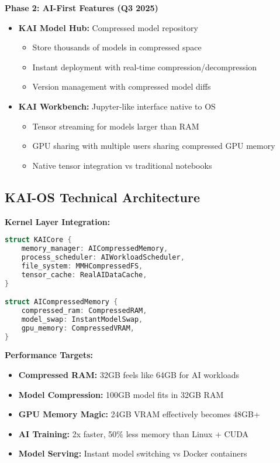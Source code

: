 \documentclass[12pt,a4paper]{article}
\begin{document}
\textbf{Phase 2: AI-First Features (Q3 2025)}
\begin{itemize}
    \item \textbf{KAI Model Hub:} Compressed model repository
    \begin{itemize}
        \item Store thousands of models in compressed space
        \item Instant deployment with real-time compression/decompression
        \item Version management with compressed model diffs
    \end{itemize}
    \item \textbf{KAI Workbench:} Jupyter-like interface native to OS
    \begin{itemize}
        \item Tensor streaming for models larger than RAM
        \item GPU sharing with multiple users sharing compressed GPU memory
        \item Native tensor integration vs traditional notebooks
    \end{itemize}
\end{itemize}

\subsection{KAI-OS Technical Architecture}

\textbf{Kernel Layer Integration:}
\begin{lstlisting}[language=Rust, caption=KAI-OS Core Architecture]
struct KAICore {
    memory_manager: AICompressedMemory,
    process_scheduler: AIWorkloadScheduler,
    file_system: MMHCompressedFS,
    tensor_cache: RealAIDataCache,
}

struct AICompressedMemory {
    compressed_ram: CompressedRAM,
    model_swap: InstantModelSwap,
    gpu_memory: CompressedVRAM,
}
\end{lstlisting}

\textbf{Performance Targets:}
\begin{itemize}
    \item \textbf{Compressed RAM:} 32GB feels like 64GB for AI workloads
    \item \textbf{Model Compression:} 100GB model fits in 32GB RAM
    \item \textbf{GPU Memory Magic:} 24GB VRAM effectively becomes 48GB+
    \item \textbf{AI Training:} 2x faster, 50\% less memory than Linux + CUDA
    \item \textbf{Model Serving:} Instant model switching vs Docker containers
\end{itemize}
\end{document}
